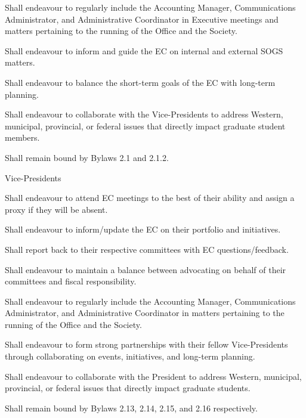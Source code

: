 \begin{longenum}[ label*=\thesubsection.\arabic*., align=left]
\begin{longenum}[ label*=\arabic*., align=left]
\begin{longenum}[ label*=\arabic*., align=left]
		\item Shall endeavour to regularly include the Accounting Manager, Communications Administrator, and Administrative Coordinator in Executive meetings and matters pertaining to the running of the Office and the Society.
		\item Shall endeavour to inform and guide the EC on internal and external SOGS matters.
		\item Shall endeavour to balance the short-term goals of the EC with long-term planning.
		\item Shall endeavour to collaborate with the Vice-Presidents to address Western, municipal, provincial, or federal issues that directly impact graduate student members.
		\item Shall remain bound by Bylaws 2.1 and 2.1.2.
		 \end{longenum}
	\item Vice-Presidents
		\begin{longenum}[ label*=\arabic*., align=left]
		\item Shall endeavour to attend EC meetings to the best of their ability and assign a proxy if they will be absent.
		\item Shall endeavour to inform/update the EC on their portfolio and initiatives. 
		\item Shall report back to their respective committees with EC questions/feedback.
		\item Shall endeavour to maintain a balance between advocating on behalf of their committees and fiscal responsibility.
		\item Shall endeavour to regularly include the Accounting Manager, Communications Administrator, and Administrative Coordinator in matters pertaining to the running of the Office and the Society.
		\item Shall endeavour to form strong partnerships with their fellow Vice-Presidents through collaborating on events, initiatives, and long-term planning.
		\item Shall endeavour to collaborate with the President to address Western, municipal, provincial, or federal issues that directly impact graduate students.
		\item Shall remain bound by Bylaws 2.13, 2.14, 2.15, and 2.16 respectively.
		\end{longenum}
	\end{longenum}
\end{longenum}

